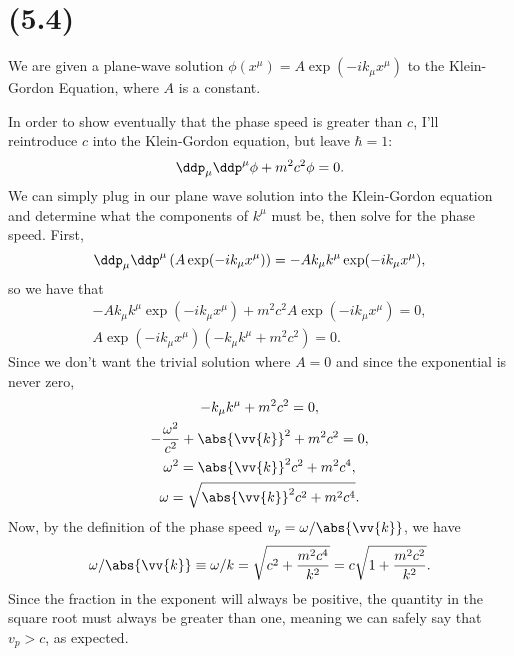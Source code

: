 
\section{(5.4)}
We are given a plane-wave solution $\phi(x^{\mu}) = A\exp(-i k_{\mu}x^{\mu})$ to the Klein-Gordon Equation, where $A$ is a constant.


\begin{parts}


\item In order to show eventually that the phase speed is greater than $c$, I'll reintroduce $c$ into the Klein-Gordon equation, but leave $\hbar = 1$:
    \begin{equation}
        \ddp_{\mu}\ddp^{\mu} \phi + m^2c^2 \phi = 0.
    \end{equation}
    We can simply plug in our plane wave solution into the Klein-Gordon equation and determine what the components of $k^{\mu}$ must be, then solve for the phase speed. First,
    \begin{equation}
        \ddp_{\mu}\ddp^{\mu} \left(A\exp(-ik_{\mu}x^{\mu})\right) = -Ak_{\mu}k^{\mu} \exp(-i k_{\mu}x^{\mu}),
    \end{equation}
    so we have that
    \begin{gather}
        -Ak_{\mu}k^{\mu} \exp(-i k_{\mu}x^{\mu}) + m^2c^2 A\exp(-i k_{\mu}x^{\mu}) = 0, \\
        A\exp(-i k_{\mu}x^{\mu}) \left(-k_{\mu}k^{\mu} + m^2c^2\right) = 0.
    \end{gather}
    Since we don't want the trivial solution where $A=0$ and since the exponential is never zero,
    \begin{gather}
        -k_{\mu}k^{\mu} + m^2c^2 = 0,\\
        -\frac{\omega^2}{c^2} + \abs{\vv{k}}^2 + m^2c^2 = 0, \\
        \omega^2 = \abs{\vv{k}}^2c^2 + m^2c^4, \\
        \omega = \sqrt{\abs{\vv{k}}^2c^2 + m^2c^4}.
    \end{gather}
    Now, by the definition of the phase speed $v_p = \omega/\abs{\vv{k}}$, we have
    \begin{equation}
        \omega/\abs{\vv{k}} \equiv \omega/k = \sqrt{c^2 + \frac{m^2c^4}{k^2}} = c \sqrt{1 + \frac{m^2c^2}{k^2}}.
    \end{equation}
    Since the fraction in the exponent will always be positive, the quantity in the square root must always be greater than one, meaning we can safely say that $v_p > c$, as expected.





\end{parts}
